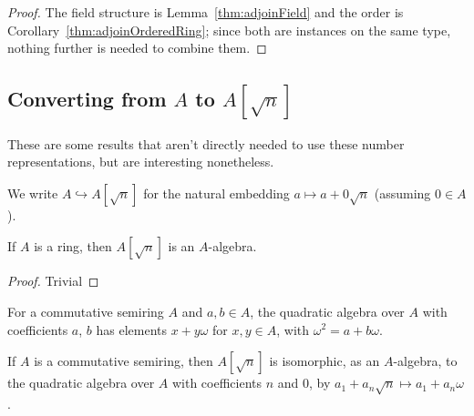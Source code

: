 \begin{proof}
  \leanok
  The field structure is Lemma~\ref{thm:adjoinField} and the order is
  Corollary~\ref{thm:adjoinOrderedRing}; since both are instances on the same
  type, nothing further is needed to combine them.
\end{proof}

\subsection{Converting from $A$ to $A[\sqrt{n}]$}

These are some results that aren't directly needed to use these number representations, but are
interesting nonetheless.


\begin{definition}[Embedding of $A$]
  \label{def:adjoinOfA}
  \leanok
  We write $A \hookrightarrow A[\sqrt{n}]$ for the natural embedding
  $a \mapsto a + 0\sqrt{n}$ (assuming $0 ∈ A$).
\end{definition}


\begin{lemma}
  \label{thm:adjoinAlgebra}
  \leanok
  If $A$ is a ring, then $A[\sqrt{n}]$ is an $A$-algebra.
\end{lemma}

\begin{proof}
  \leanok
  Trivial
\end{proof}

\begin{definition}
  \label{def:quadraticAlgebra}
  \mathlibok
  For a commutative semiring $A$ and $a, b ∈ A$, the quadratic algebra over $A$
  with coefficients $a$, $b$ has elements $x + yω$ for $x, y ∈ A$, with
  $ω^2 = a + bω$.
\end{definition}

\begin{lemma}
  \label{thm:mathlibAdjoin}
  \leanok
  If $A$ is a commutative semiring, then $A[\sqrt{n}]$ is isomorphic, as an
  $A$-algebra, to the quadratic algebra over $A$ with coefficients $n$ and $0$,
  by $a_1 + a_n\sqrt{n} \mapsto a_1 + a_nω$.
\end{lemma}

